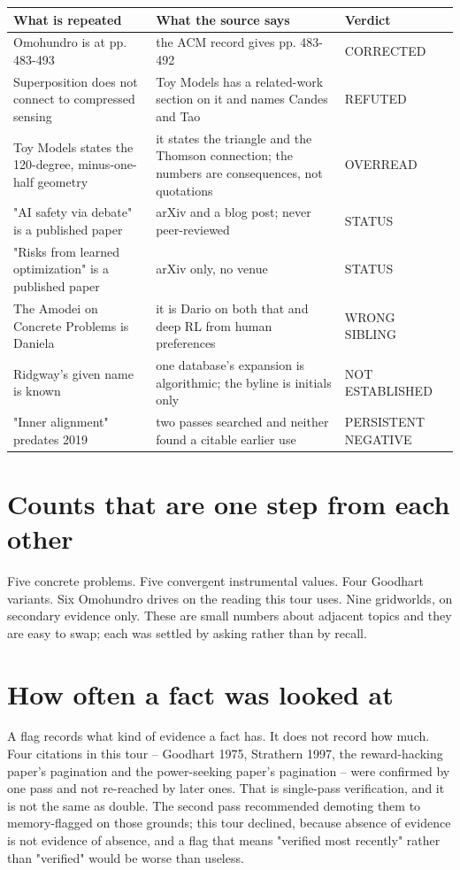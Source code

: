 \noindent
\begin{tabularx}{\textwidth}{XXX}
\toprule
What is repeated & What the source says & Verdict \\
\midrule
Omohundro is at pp. 483-493 & the ACM record gives pp. 483-492 & CORRECTED \\
Superposition does not connect to compressed sensing & Toy Models has a related-work section on it and names Candes and Tao & REFUTED \\
Toy Models states the 120-degree, minus-one-half geometry & it states the triangle and the Thomson connection; the numbers are consequences, not quotations & OVERREAD \\
"AI safety via debate" is a published paper & arXiv and a blog post; never peer-reviewed & STATUS \\
"Risks from learned optimization" is a published paper & arXiv only, no venue & STATUS \\
The Amodei on Concrete Problems is Daniela & it is Dario on both that and deep RL from human preferences & WRONG SIBLING \\
Ridgway's given name is known & one database's expansion is algorithmic; the byline is initials only & NOT ESTABLISHED \\
"Inner alignment" predates 2019 & two passes searched and neither found a citable earlier use & PERSISTENT NEGATIVE \\
\bottomrule
\end{tabularx}
\par\medskip

\section*{Counts that are one step from each other}

Five concrete problems. Five convergent instrumental values. Four Goodhart variants. Six Omohundro drives on the reading this tour uses. Nine gridworlds, on secondary evidence only. These are small numbers about adjacent topics and they are easy to swap; each was settled by asking rather than by recall.

\section*{How often a fact was looked at}

A flag records what kind of evidence a fact has. It does not record how much. Four citations in this tour -- Goodhart 1975, Strathern 1997, the reward-hacking paper's pagination and the power-seeking paper's pagination -- were confirmed by one pass and not re-reached by later ones. That is single-pass verification, and it is not the same as double. The second pass recommended demoting them to memory-flagged on those grounds; this tour declined, because absence of evidence is not evidence of absence, and a flag that means "verified most recently" rather than "verified" would be worse than useless.

